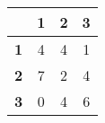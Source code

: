 \begin{tabular}{l|ccc}
\toprule
&\textbf{1} & \textbf{2} & \textbf{3}\\
\midrule
\textbf{1} & 4 & 4 & 1\\
\textbf{2} & 7 & 2 & 4\\
\textbf{3} & 0 & 4 & 6\\
\bottomrule
\end{tabular}

